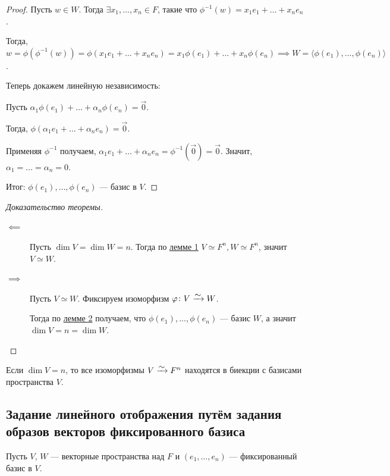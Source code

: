 \begin{proof}
    Пусть $w \in W$. Тогда $\exists x_1, \dots, x_n \in F$, такие что $\phi^{-1}(w) = x_1 e_1 + \dots + x_n e_n$.

    Тогда, $w = \phi\left(\phi^{-1}(w)\right) = \phi(x_1 e_1 + \dots + x_n e_n) = x_1 \phi(e_1) + \dots + x_n \phi(e_n) \implies W = \langle \phi(e_1), \dots, \phi(e_n) \rangle$.

    Теперь докажем линейную независимость:

    Пусть $\alpha_1 \phi(e_1) + \dots + \alpha_n \phi(e_n) = \overrightarrow{0}$.

    Тогда, $\phi(\alpha_1 e_1 + \dots + \alpha_n e_n) = \overrightarrow{0}$.

    Применяя $\phi^{-1}$ получаем, $\alpha_1 e_1 + \dots + \alpha_n e_n = \phi^{-1}(\overrightarrow{0}) = \overrightarrow{0}$. Значит, $\alpha_1 = \dots = \alpha_n = 0$.

    Итог: $\phi(e_1), \dots, \phi(e_n)$ --- базис в $V$.
\end{proof}

\begin{proof}[Доказательство теоремы]~
    \begin{description}
    \item[$\impliedby$] Пусть $\dim V= \dim W = n$. Тогда по \hyperref[lec16:lemma_1]{лемме 1} $V \simeq F^n, W \simeq F^n$, значит $V \simeq W$.
    \item[$\implies$] Пусть $V \simeq W$. Фиксируем изоморфизм $\phi \colon V \MapsTo W$.

        Тогда по \hyperref[lec16:lemma_2]{лемме 2} получаем, что $\phi(e_1), \dots, \phi(e_n)$ --- базис $W$, а значит $\dim V = n = \dim W$.
        \qedhere
    \end{description}
\end{proof}

\begin{exercise}
    Если $\dim V = n$, то все изоморфизмы $V \MapsTo F^n$ находятся в биекции с базисами пространства $V$.
\end{exercise}


\subsection{Задание линейного отображения путём задания образов векторов фиксированного базиса}

Пусть $V$, $W$ --- векторные пространства над $F$ и $(e_1, \dots, e_n)$ --- фиксированный базис в $V$.

